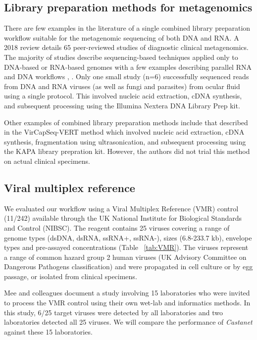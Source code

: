 \subsection{Library preparation methods for metagenomics}
There are few examples in the literature of a single combined library preparation workflow suitable for the metagenomic sequencing of both DNA and RNA. A 2018 review \parencite{Forbes2018} details 65 peer-reviewed studies of diagnostic clinical metagenomics. The majority of studies describe sequencing-based techniques applied only to DNA-based or RNA-based genomes with a few examples describing parallel RNA and DNA workflows \parencite{Langelier2018}, \parencite{Salzberg2016}. Only one small study (n=6) \parencite{Doan2016} successfully sequenced reads from DNA and RNA viruses (as well as fungi and parasites) from ocular fluid using a single protocol. This involved nucleic acid extraction, cDNA synthesis, and subsequent processing using the Illumina Nextera DNA Library Prep kit.

Other examples of combined library preparation methods include that described in the VirCapSeq-VERT method \parencite{Briese2015} which involved nucleic acid extraction, cDNA synthesis, fragmentation using ultrasonication, and subsequent processing using the KAPA library prepration kit. However, the authors did not trial this method on actual clinical specimens. 

\subsection{Viral multiplex reference}
We evaluated our workflow using a Viral Multiplex Reference (VMR) control (11/242) available through the UK National Institute for Biological Standards and Control (NIBSC). The reagent contains 25 viruses covering a range of genome types (dsDNA, dsRNA, ssRNA+, ssRNA-), sizes (6.8-233.7 kb), envelope types and pre-assayed concentrations (Table ~\ref{tab:VMR}). The viruses represent a range of common hazard group 2 human viruses (UK Advisory Committee on Dangerous Pathogens classification) and were propagated in cell culture or by egg passage, or isolated from clinical specimens.

Mee and colleagues \parencite{Mee2016} document a study involving 15 laboratories who were invited to process the VMR control using their own wet-lab and informatics methods. In this study, 6/25 target viruses were detected by all laboratories and two laboratories detected all 25 viruses. We will compare the performance of \textit{Castanet} against these 15 laboratories.

